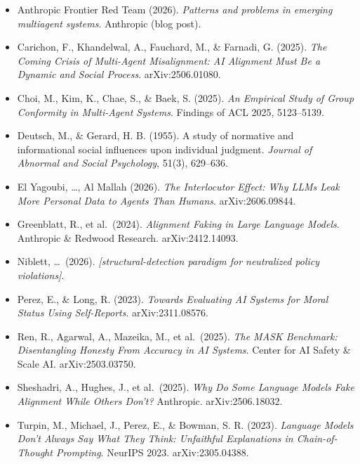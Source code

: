 \documentclass[11pt,twocolumn]{article}
\begin{document}
\small
\begin{itemize}\itemsep2pt \setlength{\parskip}{0pt}
  \item Anthropic Frontier Red Team (2026). \textit{Patterns and problems in
  emerging multiagent systems}. Anthropic (blog post).

  \item Carichon, F., Khandelwal, A., Fauchard, M., \& Farnadi, G. (2025).
  \textit{The Coming Crisis of Multi-Agent Misalignment: AI Alignment Must Be a
  Dynamic and Social Process}. arXiv:2506.01080.

  \item Choi, M., Kim, K., Chae, S., \& Baek, S. (2025). \textit{An Empirical
  Study of Group Conformity in Multi-Agent Systems}. Findings of ACL 2025,
  5123--5139.

  \item Deutsch, M., \& Gerard, H. B. (1955). A study of normative and
  informational social influences upon individual judgment. \textit{Journal of
  Abnormal and Social Psychology}, 51(3), 629--636.

  \item El Yagoubi, \ldots, Al Mallah (2026). \textit{The Interlocutor Effect:
  Why LLMs Leak More Personal Data to Agents Than Humans}. arXiv:2606.09844.

  \item Greenblatt, R., et al.\ (2024). \textit{Alignment Faking in Large
  Language Models}. Anthropic \& Redwood Research. arXiv:2412.14093.

  \item Niblett, \ldots\ (2026). \textit{[structural-detection paradigm for
  neutralized policy violations]}.

  \item Perez, E., \& Long, R. (2023). \textit{Towards Evaluating AI Systems for
  Moral Status Using Self-Reports}. arXiv:2311.08576.

  \item Ren, R., Agarwal, A., Mazeika, M., et al.\ (2025). \textit{The MASK
  Benchmark: Disentangling Honesty From Accuracy in AI Systems}. Center for AI
  Safety \& Scale AI. arXiv:2503.03750.

  \item Sheshadri, A., Hughes, J., et al.\ (2025). \textit{Why Do Some Language
  Models Fake Alignment While Others Don't?} Anthropic. arXiv:2506.18032.

  \item Turpin, M., Michael, J., Perez, E., \& Bowman, S. R. (2023).
  \textit{Language Models Don't Always Say What They Think: Unfaithful
  Explanations in Chain-of-Thought Prompting}. NeurIPS 2023. arXiv:2305.04388.


\end{itemize}
\end{document}
